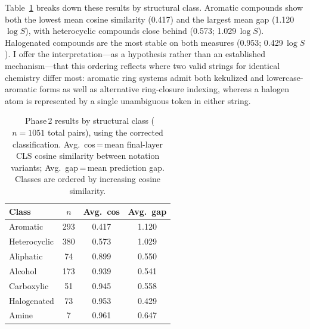 \documentclass[twoside,twocolumn,9pt]{article}
\newcommand{\logS}{\ensuremath{\log S}}
\begin{document}
Table~\ref{tbl:phase2} breaks down these results by structural class. Aromatic compounds show both the lowest mean cosine similarity (0.417) and the largest mean gap (1.120\,$\logS$), with heterocyclic compounds close behind (0.573; 1.029\,$\logS$). Halogenated compounds are the most stable on both measures (0.953; 0.429\,$\logS$). I offer the interpretation---as a hypothesis rather than an established mechanism---that this ordering reflects where two valid strings for identical chemistry differ most: aromatic ring systems admit both kekulized and lowercase-aromatic forms as well as alternative ring-closure indexing, whereas a halogen atom is represented by a single unambiguous token in either string.

\begin{table}[h]
\small
\caption{\ Phase\,2 results by structural class ($n=1051$ total pairs), using the corrected classification. Avg.\ cos\,=\,mean final-layer CLS cosine similarity between notation variants; Avg.\ gap\,=\,mean prediction gap. Classes are ordered by increasing cosine similarity.}
\label{tbl:phase2}
\begin{tabular*}{0.48\textwidth}{@{\extracolsep{\fill}}lccc}
\hline
Class & $n$ & Avg.\ cos & Avg.\ gap \\
\hline
Aromatic     & 293 & 0.417 & 1.120 \\
Heterocyclic & 380 & 0.573 & 1.029 \\
Aliphatic    &  74 & 0.899 & 0.550 \\
Alcohol      & 173 & 0.939 & 0.541 \\
Carboxylic   &  51 & 0.945 & 0.558 \\
Halogenated  &  73 & 0.953 & 0.429 \\
Amine        &   7 & 0.961 & 0.647 \\
\hline
\end{tabular*}
\end{table}
\end{document}
